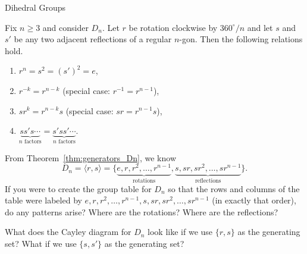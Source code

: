 \begin{section}{Dihedral Groups}
\begin{theorem}
Fix $n\geq 3$ and consider $D_n$. Let $r$ be rotation clockwise by $360^{\circ}/n$  and let $s$ and $s'$ be any two adjacent reflections of a regular $n$-gon.  Then the following relations hold.
\begin{enumerate}[label=\rm{(\alph*)}]
\item $r^n = s^2 = (s')^2 =e$,
\item $r^{-k} = r^{n-k}$ (special case: $r^{-1}=r^{n-1}$),
\item $sr^k=r^{n-k}s$ (special case: $sr=r^{n-1}s$),
\item $\underbrace{ss's\cdots}_{n\text{ factors}}=\underbrace{s'ss'\cdots}_{n\text{ factors}}$.
\end{enumerate}
\end{theorem}

\begin{problem}
From Theorem~\ref{thm:generators_Dn}, we know
\[
D_n=\langle r,s\rangle =\{\underbrace{e,r,r^2,\ldots, r^{n-1}}_{\text{rotations}},\underbrace{s,sr,sr^2,\ldots,sr^{n-1}}_{\text{reflections}}\}.
\]
If you were to create the group table for $D_n$ so that the rows and columns of the table were labeled by $e,r,r^2,\ldots, r^{n-1},s,sr,sr^2,\ldots,sr^{n-1}$ (in exactly that order), do any patterns arise?  Where are the rotations? Where are the reflections?
\end{problem}

\begin{problem}
What does the Cayley diagram for $D_n$ look like if we use $\{r,s\}$ as the generating set?  What if we use $\{s,s'\}$ as the generating set?
\end{problem}

\end{section}

